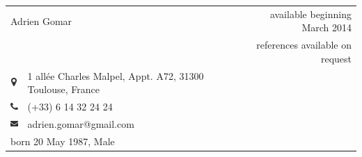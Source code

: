 \documentclass[10pt]{article}
\begin{document}
\begin{tabular}[ht]{clr}
	\multicolumn{2}{l}{\LARGE Adrien Gomar} & {\large available beginning March 2014} \\
	& & \phantom{aaaaaaaaaaaaaaaaaaaa} {references available on request} \\
	\includegraphics[height=9pt]{pictures/icon-map.pdf} & 1 allée Charles Malpel, Appt. A72, 31300 Toulouse, France \\
	\includegraphics[height=9pt]{pictures/icon-phone.pdf} & (+33) 6 14 32 24 24 \\
	\includegraphics[height=9pt]{pictures/icon-mail.pdf} & adrien.gomar@gmail.com \\
	\multicolumn{2}{l}{born 20 May 1987, Male} & \\
\end{tabular}

\begin{mytable}
\end{mytable}
\end{document}
